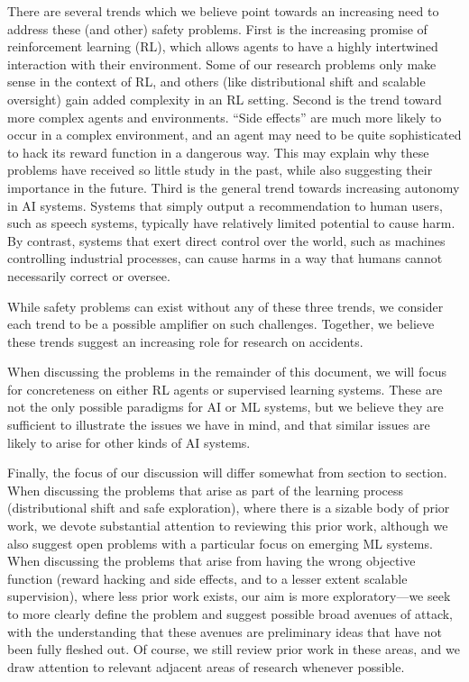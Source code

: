 \documentclass[a4paper,10pt]{article}
\begin{document}
There are several trends which we believe point towards an increasing need to address these (and other) safety problems.  First is the increasing promise of reinforcement learning (RL), which allows agents to have a highly intertwined interaction with their environment.  Some of our research problems only make sense in the context of RL, and others (like distributional shift and scalable oversight) gain added complexity in an RL setting.  Second is the trend toward more complex agents and environments.  ``Side effects'' are much more likely to occur in a complex environment, and an agent may need to be quite sophisticated to hack its reward function in a dangerous way.  This may explain why these problems have received so little study in the past, while also suggesting their importance in the future.  Third is the general trend towards increasing autonomy in AI systems.  Systems that simply output a recommendation to human users, such as speech systems, typically have relatively limited potential to cause harm.  By contrast, systems that exert direct control over the world, such as machines controlling industrial processes, can cause harms in a way that humans cannot necessarily correct or oversee.

While safety problems can exist without any of these three trends, we consider each trend to be a possible amplifier on such challenges.  Together, we believe these trends suggest an increasing role for research on accidents.

When discussing the problems in the remainder of this document, we will focus for concreteness on either RL agents or supervised learning systems.  These are not the only possible paradigms for AI or ML systems, but we believe they are sufficient to illustrate the issues we have in mind, and that similar issues are likely to arise for other kinds of AI systems.

Finally, the focus of our discussion will differ somewhat from section to section.  When discussing the problems that arise as part of the learning process (distributional shift and safe exploration), where there is a sizable body of prior work, we devote substantial attention to reviewing this prior work, although we also suggest open problems with a particular focus on emerging ML systems.  When discussing the problems that arise from having the wrong objective function (reward hacking and side effects, and to a lesser extent scalable supervision), where less prior work exists, our aim is more exploratory---we seek to more clearly define the problem and suggest possible broad avenues of attack, with the understanding that these avenues are preliminary ideas that have not been fully fleshed out.  Of course, we still review prior work in these areas, and we draw attention to relevant adjacent areas of research whenever possible.
\end{document}
